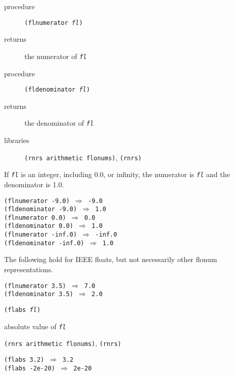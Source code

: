 \begin{description}

\label{objects_s191}\item[procedure] \texttt{(flnumerator \textit{fl})}



\item[returns] the numerator of \texttt{\textit{fl}}


\item[procedure] \texttt{(fldenominator \textit{fl})}



\item[returns] the denominator of \texttt{\textit{fl}}


\item[libraries] \texttt{(rnrs arithmetic flonums)}, \texttt{(rnrs)}
\end{description}


If \texttt{\textit{fl}} is an integer, including 0.0, or infinity, the numerator is \texttt{\textit{fl}}
and the denominator is 1.0.


\begin{alltt}
(flnumerator -9.0) \(\Rightarrow\) -9.0
(fldenominator -9.0) \(\Rightarrow\) 1.0
(flnumerator 0.0) \(\Rightarrow\) 0.0
(fldenominator 0.0) \(\Rightarrow\) 1.0
(flnumerator -inf.0) \(\Rightarrow\) -inf.0
(fldenominator -inf.0) \(\Rightarrow\) 1.0
\end{alltt}


The following hold for IEEE floats, but not necessarily other
flonum representations.


\begin{alltt}
(flnumerator 3.5) \(\Rightarrow\) 7.0
(fldenominator 3.5) \(\Rightarrow\) 2.0
\end{alltt}

\begin{description}

\label{objects_s192}\item[procedure] \texttt{(flabs \textit{fl})}



\item[returns] absolute value of \texttt{\textit{fl}}


\item[libraries] \texttt{(rnrs arithmetic flonums)}, \texttt{(rnrs)}
\end{description}


\begin{alltt}
(flabs 3.2) \(\Rightarrow\) 3.2
(flabs -2e-20) \(\Rightarrow\) 2e-20
\end{alltt}

